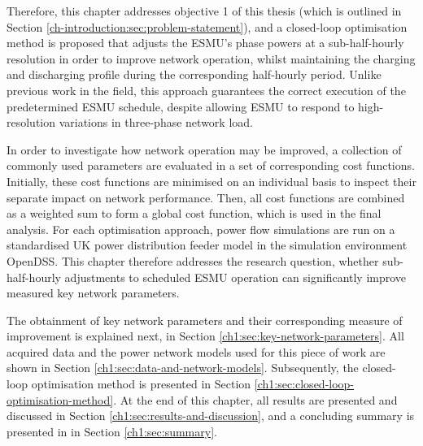 Therefore, this chapter addresses objective 1 of this thesis (which is outlined in Section \ref{ch-introduction:sec:problem-statement}), and a closed-loop optimisation method is proposed that adjusts the ESMU's phase powers at a sub-half-hourly resolution in order to improve network operation, whilst maintaining the charging and discharging profile during the corresponding half-hourly period.
Unlike previous work in the field, this approach guarantees the correct execution of the predetermined ESMU schedule, despite allowing ESMU to respond to high-resolution variations in three-phase network load.

In order to investigate how network operation may be improved, a collection of commonly used parameters are evaluated in a set of corresponding cost functions.
Initially, these cost functions are minimised on an individual basis to inspect their separate impact on network performance.
Then, all cost functions are combined as a weighted sum to form a global cost function, which is used in the final analysis.
For each optimisation approach, power flow simulations are run on a standardised UK power distribution feeder model in the simulation environment OpenDSS.
This chapter therefore addresses the research question, whether sub-half-hourly adjustments to scheduled ESMU operation can significantly improve measured key network parameters.

The obtainment of key network parameters and their corresponding measure of improvement is explained next, in Section \ref{ch1:sec:key-network-parameters}.
All acquired data and the power network models used for this piece of work are shown in Section \ref{ch1:sec:data-and-network-models}.
Subsequently, the closed-loop optimisation method is presented in Section \ref{ch1:sec:closed-loop-optimisation-method}.
At the end of this chapter, all results are presented and discussed in Section \ref{ch1:sec:results-and-discussion}, and a concluding summary is presented in in Section \ref{ch1:sec:summary}.
